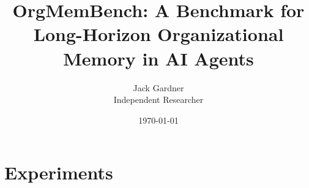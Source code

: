 \documentclass[11pt]{article}
\title{OrgMemBench: A Benchmark for Long-Horizon Organizational Memory in AI Agents}
\author{%
  Jack Gardner \\
  Independent Researcher \\
}
\date{\today}
\newcommand{\bench}{\textsc{OrgMemBench}\xspace}
\begin{document}
\maketitle












\section{Experiments}
\label{sec:experiments}


\end{document}
